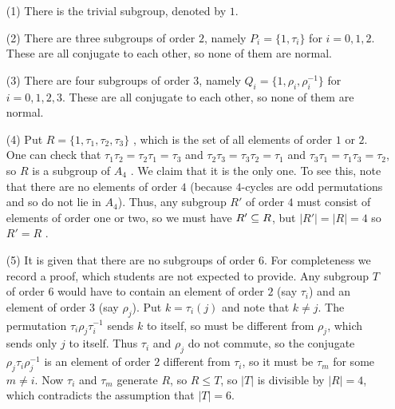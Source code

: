 \documentclass[a4paper]{article}
\begin{document}
\begin{solution}
\begin{itemize}
\begin{itemize}
    \item[(1)] There is the trivial subgroup, denoted by $1$.
    \item[(2)] There are three subgroups of order $2$, namely
     $P_i=\{1,\tau_i\}$ for $i=0,1,2$.  These are all conjugate to
     each other, so none of them are normal. \mk
    \item[(3)] There are four subgroups of order $3$, namely
     $Q_i=\{1,\rho_i,\rho_i^{-1}\}$ for $i=0,1,2,3$.
     These are all conjugate to each other, so none of them are
     normal. 
    \item[(4)] Put $R=\{1,\tau_1,\tau_2,\tau_3\}$ \mk, which is the set of
     all elements of order $1$ or $2$.  One can check that
     $\tau_1\tau_2=\tau_2\tau_1=\tau_3$ and
     $\tau_2\tau_3=\tau_3\tau_2=\tau_1$  and
     $\tau_3\tau_1=\tau_1\tau_3=\tau_2$, so $R$ is a subgroup of
     $A_4$ \mk.  We claim that it is the only one.  To see this, note that
     there are no elements of order $4$ (because $4$-cycles 
     are odd permutations and so do not lie in $A_4$).  Thus, any
     subgroup $R'$ of order $4$ must consist of elements of order one
     or two, so we must have $R'\subseteq R$, but $|R'|=|R|=4$ so $R'=R$ .
    \item[(5)] It is given that there are no subgroups of order $6$.
     For completeness we record a proof, which students are not
     expected to provide.  Any subgroup $T$ of order $6$ would have to
     contain an element of order $2$ (say $\tau_i$) and an element of
     order $3$ (say $\rho_j$).  Put $k=\tau_i(j)$ and note that
     $k\neq j$.  The permutation $\tau_i\rho_j\tau_i^{-1}$ sends $k$
     to itself, so must be different from $\rho_j$, which sends only
     $j$ to itself.  Thus $\tau_i$ and $\rho_j$ do not commute, so
     the conjugate $\rho_j\tau_i\rho_j^{-1}$ is an element of order
     $2$ different from $\tau_i$, so it must be $\tau_m$ for some
     $m\neq i$.  Now $\tau_i$ and $\tau_m$ generate $R$, so $R\leq T$,
     so $|T|$ is divisible by $|R|=4$, which contradicts the
     assumption that $|T|=6$.


\end{itemize}
\end{itemize}
\end{solution}
\end{document}

